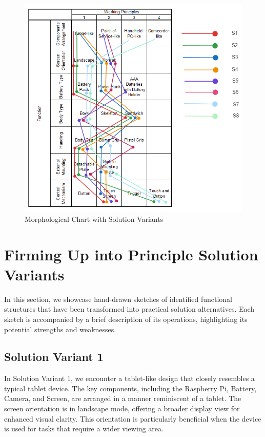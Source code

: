 \begin{figure}[ht!]
    \centering
    \includegraphics[width=\linewidth]{texs/Part1/chapter3/image/combinedchart.png}
    \caption{Morphological Chart with Solution Variants}
    \label{fig:morphological-chart-with-solution-variants}
\end{figure}

\section{Firming Up into Principle Solution Variants}
In this section, we showcase hand-drawn sketches of identified functional structures that have been transformed into practical solution alternatives. Each sketch is accompanied by a brief description of its operations, highlighting its potential strengths and weaknesses.

\subsection{Solution Variant 1}
In Solution Variant 1, we encounter a tablet-like design that closely resembles a typical tablet device. The key components, including the Raspberry Pi, Battery, Camera, and Screen, are arranged in a manner reminiscent of a tablet. The screen orientation is in landscape mode, offering a broader display view for enhanced visual clarity. This orientation is particularly beneficial when the device is used for tasks that require a wider viewing area.

